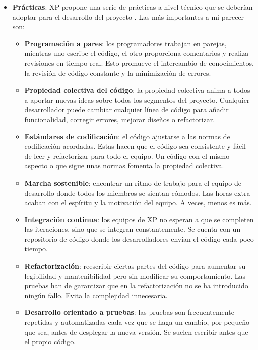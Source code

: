 \begin{itemize}
    \item \textbf{Prácticas}: XP propone una serie de prácticas a nivel técnico que se deberían adoptar para el desarrollo del proyecto \cite{extremeXP_Page}. Las más importantes a mi parecer son:
    \begin{itemize}
        \item \textbf{Programación a pares}: los programadores trabajan en parejas, mientras uno escribe el código, el otro proporciona comentarios y realiza revisiones en tiempo real. Esto promueve el intercambio de conocimientos, la revisión de código constante y la minimización de errores.
        \item \textbf{Propiedad colectiva del código}: la propiedad colectiva anima a todos a aportar nuevas ideas sobre todos los segmentos del proyecto. Cualquier desarrollador puede cambiar cualquier línea de código para añadir funcionalidad, corregir errores, mejorar diseños o refactorizar.
        \item \textbf{Estándares de codificación}: el código ajustarse a las normas de codificación acordadas. Estas hacen que el código sea consistente y fácil de leer y refactorizar para todo el equipo. Un código con el mismo aspecto o que sigue unas normas fomenta la propiedad colectiva.
        \item \textbf{Marcha sostenible}: encontrar un ritmo de trabajo para el equipo de desarrollo donde todos los miembros se sientan cómodos. Las horas extra acaban con el espíritu y la motivación del equipo. A veces, menos es más.
        \item \textbf{Integración continua}: los equipos de XP no esperan a que se completen las iteraciones, sino que se integran constantemente. Se cuenta con un repositorio de código donde los desarrolladores envían el código cada poco tiempo.
        \item \textbf{Refactorización}: reescribir ciertas partes del código para aumentar su legibilidad y mantenibilidad pero sin modificar su comportamiento. Las pruebas han de garantizar que en la refactorización no se ha introducido ningún fallo. Evita la complejidad innecesaria.
        \item \textbf{Desarrollo orientado a pruebas}: las pruebas son frecuentemente repetidas y automatizadas cada vez que se haga un cambio, por pequeño que sea, antes de desplegar la nueva versión. Se suelen escribir antes que el propio código.
    \end{itemize}
    

\end{itemize}
